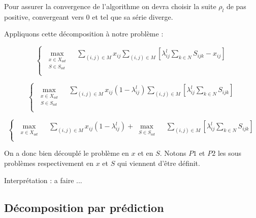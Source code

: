 \documentclass[a4paper,11pt] {article}
\begin{document}
Pour assurer la convergence de l'algorithme on devra choisir la suite $\rho_l$ de pas positive, convergeant vers $0$ et tel que sa série diverge.

Appliquons cette décomposition à notre problème : 

\begin{equation}
\left\{
\begin{array}{l}
\max\limits_{\substack{x\in X_{ad}\\S\in S_{ad}} }\quad\sum\limits_{(i,j)\in M} x_{ij}\sum\limits_{(i,j)\in M}[\lambda_{ij}^l \sum\limits_{k\in N} S_{ijk} - x_{ij}]\\
\end{array}
\right.
\end{equation}

\begin{equation}
\left\{
\begin{array}{l}
\max\limits_{\substack{x\in X_{ad}\\S\in S_{ad}} }\quad\sum\limits_{(i,j)\in M} x_{ij}(1-\lambda_{ij}^l)\sum\limits_{(i,j)\in M}[\lambda_{ij}^l \sum\limits_{k\in N} S_{ijk}]\\
\end{array}
\right.
\end{equation}


\begin{equation}
\left\{
\begin{array}{l}
\max\limits_{\substack{x\in X_{ad}} }\quad\sum\limits_{(i,j)\in M} x_{ij}(1-\lambda_{ij}^l)+ \max\limits_{\substack{S\in S_{ad}}} \quad \sum\limits_{(i,j)\in M}[\lambda_{ij}^l \sum\limits_{k\in N} S_{ijk}]\\
\end{array}
\right.
\end{equation}

On a donc bien découplé le problème en $x$ et en $S$. Notons $P1$ et $P2$ les sous problèmes respectivement en $x$ et $S$ qui viennent d'être définit.

Interprétation : a faire ...


\subsection{Décomposition par prédiction}
\end{document}
